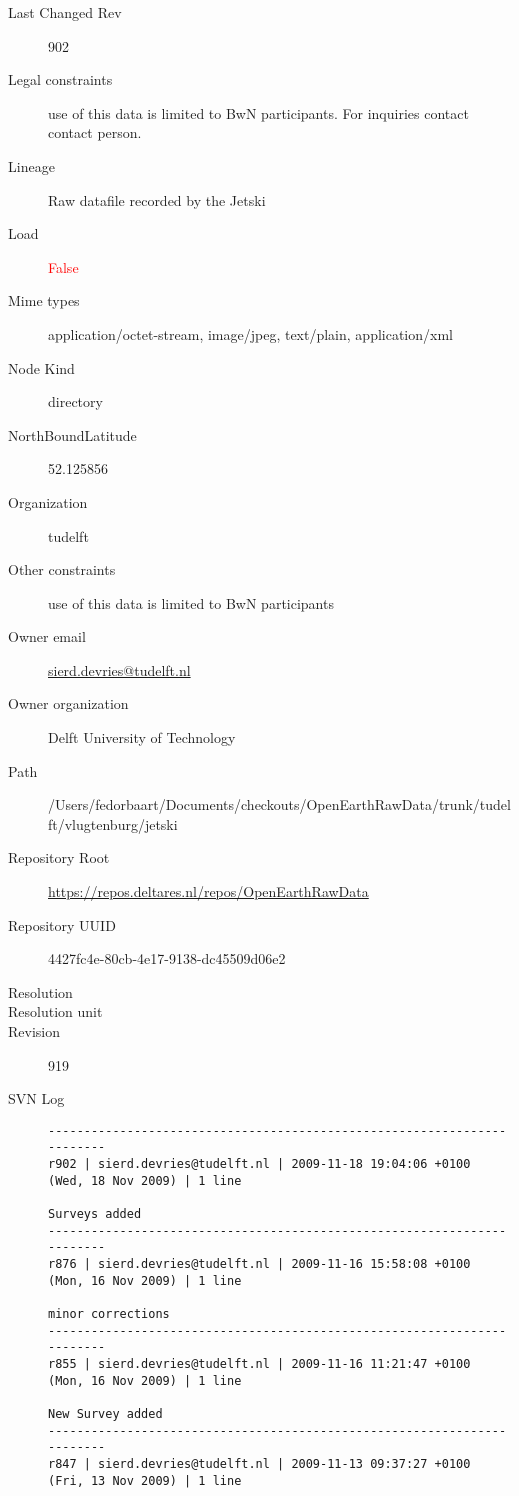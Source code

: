 \documentclass[9]{report}
\begin{document}
\begin{description}
  \item[Last Changed Rev] 902
  \item[Legal constraints] use of this data is limited to BwN participants. For inquiries contact contact person.
  \item[Lineage] Raw datafile recorded by the Jetski
  \item[Load] \textcolor{red}{False}
  \item[Mime types] application/octet-stream, image/jpeg, text/plain, application/xml
  \item[Node Kind] directory
  \item[NorthBoundLatitude] 52.125856
  \item[Organization] tudelft
  \item[Other constraints] use of this data is limited to BwN participants
  \item[Owner email] \href{mailto:sierd.devries@tudelft.nl}{sierd.devries@tudelft.nl}
  \item[Owner organization] Delft University of Technology
  \item[Path] /Users/fedorbaart/Documents/checkouts/OpenEarthRawData/trunk/tudelft/vlugtenburg/jetski
  \item[Repository Root] \href{https://repos.deltares.nl/repos/OpenEarthRawData}{https://repos.deltares.nl/repos/OpenEarthRawData}
  \item[Repository UUID] 4427fc4e-80cb-4e17-9138-dc45509d06e2
  \item[Resolution] 
  \item[Resolution unit] 
  \item[Revision] 919
  \item[SVN Log] \begin{verbatim}
------------------------------------------------------------------------
r902 | sierd.devries@tudelft.nl | 2009-11-18 19:04:06 +0100 (Wed, 18 Nov 2009) | 1 line

Surveys added
------------------------------------------------------------------------
r876 | sierd.devries@tudelft.nl | 2009-11-16 15:58:08 +0100 (Mon, 16 Nov 2009) | 1 line

minor corrections
------------------------------------------------------------------------
r855 | sierd.devries@tudelft.nl | 2009-11-16 11:21:47 +0100 (Mon, 16 Nov 2009) | 1 line

New Survey added
------------------------------------------------------------------------
r847 | sierd.devries@tudelft.nl | 2009-11-13 09:37:27 +0100 (Fri, 13 Nov 2009) | 1 line



\end{verbatim}
\end{description}
\end{document}
